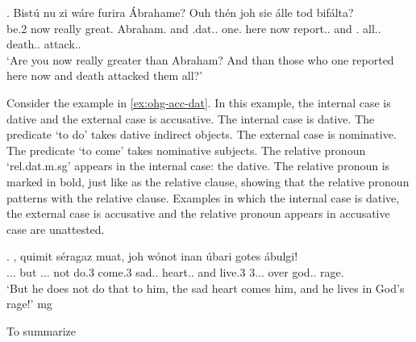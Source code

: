 \exg. Bistú nu {zi wáre} furira Ábrahame? Ouh thén     joh sie álle tod bifálta?\\
{be.2 } now really {great}.\scsub{[dat]} Abraham. and .\ac{dat}.. one. here now report..\scsub{[acc]}
and . all.. death.. attack..\\
`Are you now really greater than Abraham? And than those who one reported here now and death attacked them all?' \label{ex:ohg-dat-acc}

Consider the example in \ref{ex:ohg-acc-dat}. In this example, the internal case is dative and the external case is accusative.
The internal case is dative. The predicate  `to do' takes dative indirect objects.
The external case is nominative. The predicate  `to come' takes nominative subjects.
The relative pronoun  `\ac{rel}.\ac{dat}.\ac{m}.\ac{sg}' appears in the internal case: the dative. The relative pronoun is marked in bold, just like as the relative clause, showing that the relative pronoun patterns with the relative clause.
Examples in which the internal case is dative, the external case is accusative and the relative pronoun appears in accusative case are unattested.


\exg.     , quimit séragaz muat, joh wónot inan úbari gotes ábulgi!\\
... but ... not do.3\scsub{[dat?]} come.3\scsub{[acc?]} sad.. heart..
and live.3 3... over god.. rage.\\
`But he does not do that to him, the sad heart comes him, and he lives in God's rage!' \label{ex:ohg-acc-dat}
mg

To summarize


